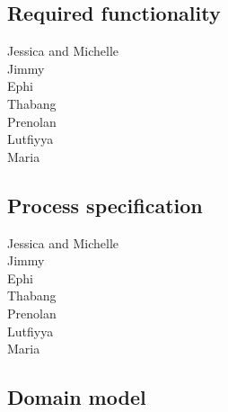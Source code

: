 \documentclass[a4paper,11pt]{article}
\begin{document}
\subsection{Required functionality}
Jessica and Michelle\\
Jimmy\\
Ephi\\
Thabang\\
Prenolan\\
Lutfiyya\\
Maria\\

\subsection{Process specification}
Jessica and Michelle\\
Jimmy\\
Ephi\\
Thabang\\
Prenolan\\
Lutfiyya\\
Maria\\

\subsection{Domain model}
\end{document}
